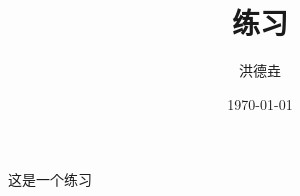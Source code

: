 \documentclass{article}
\title{\kaishu 练习}
\author{\heiti 洪德垚}
\date{\today}
\begin{document}
    \maketitle
    这是一个练习
\end{document}
